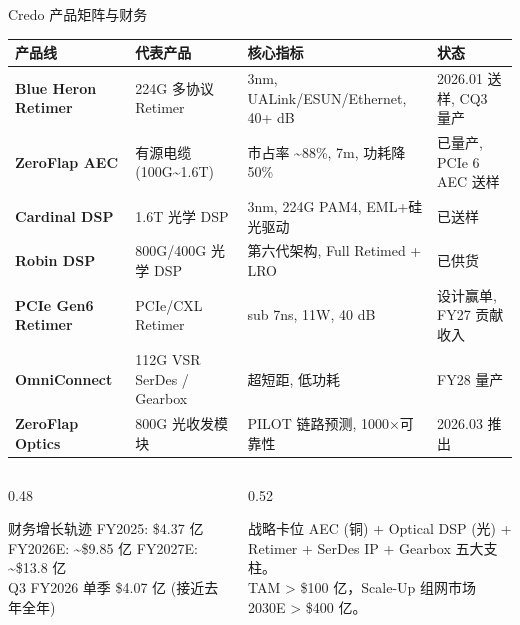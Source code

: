 \documentclass[aspectratio=169, 10pt, UTF8]{ctexbeamer}
\begin{document}
\begin{frame}{Credo 产品矩阵与财务}
  \centering
  \scriptsize
  \begin{tabularx}{\textwidth}{p{2.2cm} p{3.0cm} p{3.3cm} p{3.5cm}}
    \toprule
    \textbf{产品线} & \textbf{代表产品} & \textbf{核心指标} & \textbf{状态} \\
    \midrule
    \textbf{Blue Heron Retimer}
      & 224G 多协议 Retimer
      & 3nm, UALink/ESUN/Ethernet, 40+ dB
      & 2026.01 送样, CQ3 量产 \\
    \addlinespace
    \textbf{ZeroFlap AEC}
      & 有源电缆 (100G{\textasciitilde}1.6T)
      & 市占率 {\textasciitilde}88\%, 7m, 功耗降 50\%
      & 已量产, PCIe 6 AEC 送样 \\
    \addlinespace
    \textbf{Cardinal DSP}
      & 1.6T 光学 DSP
      & 3nm, 224G PAM4, EML+硅光驱动
      & 已送样 \\
    \addlinespace
    \textbf{Robin DSP}
      & 800G/400G 光学 DSP
      & 第六代架构, Full Retimed + LRO
      & 已供货 \\
    \addlinespace
    \textbf{PCIe Gen6 Retimer}
      & PCIe/CXL Retimer
      & sub 7ns, 11W, 40 dB
      & 设计赢单, FY27 贡献收入 \\
    \addlinespace
    \textbf{OmniConnect}
      & 112G VSR SerDes / Gearbox
      & 超短距, 低功耗
      & FY28 量产 \\
    \addlinespace
    \textbf{ZeroFlap Optics}
      & 800G 光收发模块
      & PILOT 链路预测, 1000×可靠性
      & 2026.03 推出 \\
    \bottomrule
  \end{tabularx}

  \vspace{-1pt}
  \begin{columns}[T]
    \begin{column}{0.48\textwidth}
      \begin{exampleblock}{财务增长轨迹}
        FY2025: \$4.37 亿 \quad FY2026E: {\textasciitilde}\$9.85 亿 \quad FY2027E: {\textasciitilde}\$13.8 亿 \\
        Q3 FY2026 单季 \$4.07 亿 (接近去年全年)
      \end{exampleblock}
    \end{column}
    \begin{column}{0.52\textwidth}
      \begin{alertblock}{战略卡位}
        AEC (铜) + Optical DSP (光) + Retimer + SerDes IP + Gearbox 五大支柱。\\
        TAM > \$100 亿，Scale-Up 组网市场 2030E > \$400 亿。
      \end{alertblock}
    \end{column}
  \end{columns}
\end{frame}
\end{document}

